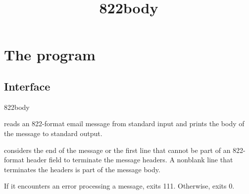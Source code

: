 \documentclass{book}
\title{822body}
\begin{document}
\section{The  program}

\subsection{Interface}
\begin{code}
  822body
\end{code}

 reads an 822-format email message from standard input
and prints the body of the message to standard output.

 considers the end of the message or the first line that
cannot be part of an 822-format header field to terminate the message
headers.  A nonblank line that terminates the headers is part of the
message body.

If it encounters an error processing a message,  exits 111.
Otherwise,  exits 0.
\end{document}
